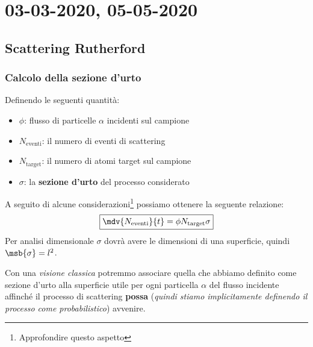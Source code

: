 \chapter{03-03-2020, 05-05-2020}
\section{Scattering Rutherford}
\subsection{Calcolo della sezione d'urto}
Definendo le seguenti quantità:
\begin{itemize}
	\item $\phi$: flusso di particelle $\alpha$ incidenti sul campione
	\item $N_{\text{eventi}}$: il numero di eventi di scattering
	\item $N_{\text{target}}$: il numero di atomi target sul campione
	\item $\sigma$: la \textbf{sezione d'urto} del processo considerato
\end{itemize}
A seguito di alcune considerazioni\footnote{Approfondire questo aspetto}
possiamo ottenere la seguente relazione:
\begin{equation}
	\boxed{\mdv{N_{\text{eventi}}}{t} = \phi N_{\text{target}} \sigma}
\end{equation}
Per analisi dimensionale $\sigma$ dovrà avere le dimensioni di una superficie,
quindi $\msb{\sigma} = l^2$.\par Con una \textit{visione classica} potremmo
associare quella che abbiamo definito come sezione d'urto alla superficie utile
per ogni particella $\alpha$ del flusso incidente affinché il processo di
scattering \textbf{possa} (\textit{quindi stiamo implicitamente definendo il
	processo come probabilistico}) avvenire.

